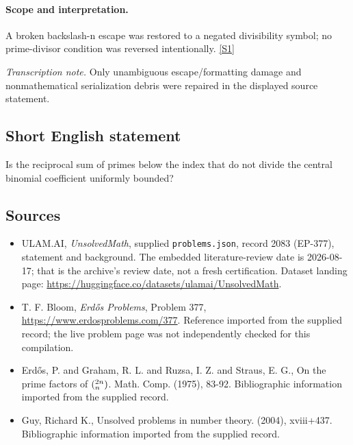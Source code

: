 \documentclass[11pt,a4paper]{article}
\newcommand{\sref}[2]{\hyperlink{source:#1:#2}{[S#2]}}
\begin{document}
\paragraph{Scope and interpretation.}

A broken backslash-n escape was restored to a negated divisibility symbol; no prime-divisor condition was reversed intentionally. \sref{2083}{1}

{\small\emph{Transcription note.} Only unambiguous escape/formatting damage and nonmathematical serialization debris were repaired in the displayed source statement.}

\subsection{Short English statement}

Is the reciprocal sum of primes below the index that do not divide the central binomial coefficient uniformly bounded?

\subsection{Sources}

{\small

\begin{itemize}

\item[\hypertarget{source:2083:1}{S1}] ULAM.AI, \emph{UnsolvedMath}, supplied \texttt{problems.json}, record 2083 (EP-377), statement and background. The embedded literature-review date is 2026-08-17; that is the archive’s review date, not a fresh certification. Dataset landing page: \url{https://huggingface.co/datasets/ulamai/UnsolvedMath}.

\item[\hypertarget{source:2083:2}{S2}] T. F. Bloom, \emph{Erdős Problems}, Problem 377, \url{https://www.erdosproblems.com/377}. Reference imported from the supplied record; the live problem page was not independently checked for this compilation.

\item[\hypertarget{source:2083:3}{S3}] Erd\H{o}s, P. and Graham, R. L. and Ruzsa, I. Z. and Straus, E. G., On the prime factors of $(\sp{2n}\sb{n})$. Math. Comp. (1975), 83-92. Bibliographic information imported from the supplied record.

\item[\hypertarget{source:2083:4}{S4}] Guy, Richard K., Unsolved problems in number theory. (2004), xviii+437. Bibliographic information imported from the supplied record.

\end{itemize}

}

\label{end:2083}
\end{document}
